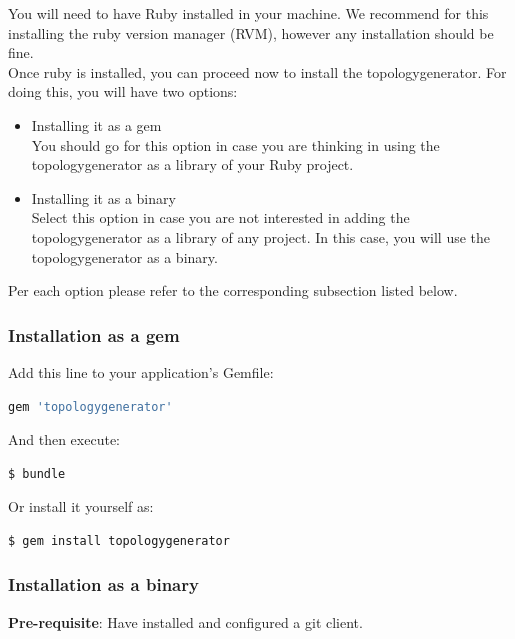You will need to have Ruby installed in your machine. We recommend for this installing the ruby version manager (RVM), however any installation should be fine.\\

Once ruby is installed, you can proceed now to install the topologygenerator. For doing this, you will have two options: 
\begin{itemize}
\item Installing it as a gem \\
You should go for this option in case you are thinking in using the topologygenerator as a library of your Ruby project. 
\item Installing it as a binary \\
Select this option in case you are not interested in adding the topologygenerator as a library of any project. In this case, you will use the topologygenerator as a binary.
\end{itemize}

Per each option please refer to the corresponding subsection listed below.

\subsubsection{Installation as a gem}

Add this line to your application's Gemfile:

\begin{lstlisting}[language=Ruby,breaklines=true]
gem 'topologygenerator'
\end{lstlisting}

And then execute:

\begin{lstlisting}[language=bash,breaklines=true]
$ bundle
\end{lstlisting}

Or install it yourself as: 

\begin{lstlisting}[language=bash,breaklines=true]
$ gem install topologygenerator
\end{lstlisting}

\subsubsection{Installation as a binary}

\textbf{Pre-requisite}: Have installed and configured a git client. \\

